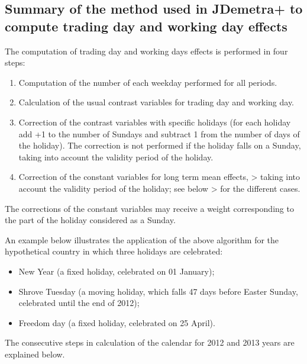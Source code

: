 \documentclass[
  letterpaper,
  DIV=11,
  numbers=noendperiod]{scrreprt}
\begin{document}
\hypertarget{summary-of-the-method-used-in-jdemetra-to-compute-trading-day-and-working-day-effects}{%
\subsection{Summary of the method used in JDemetra+ to compute trading
day and working day
effects}\label{summary-of-the-method-used-in-jdemetra-to-compute-trading-day-and-working-day-effects}}

The computation of trading day and working days effects is performed in
four steps:

\begin{enumerate}
\def\labelenumi{\arabic{enumi}.}
\item
  Computation of the number of each weekday performed for all periods.
\item
  Calculation of the usual contrast variables for trading day and
  working day.
\item
  Correction of the contrast variables with specific holidays (for each
  holiday add +1 to the number of Sundays and subtract 1 from the number
  of days of the holiday). The correction is not performed if the
  holiday falls on a Sunday, taking into account the validity period of
  the holiday.
\item
  Correction of the constant variables for long term mean effects,
  \textgreater{} taking into account the validity period of the holiday;
  see below \textgreater{} for the different cases.
\end{enumerate}

The corrections of the constant variables may receive a weight
corresponding to the part of the holiday considered as a Sunday.

An example below illustrates the application of the above algorithm for
the hypothetical country in which three holidays are celebrated:

\begin{itemize}
\item
  New Year (a fixed holiday, celebrated on 01 January);
\item
  Shrove Tuesday (a moving holiday, which falls 47 days before Easter
  Sunday, celebrated until the end of 2012);
\item
  Freedom day (a fixed holiday, celebrated on 25 April).
\end{itemize}

The consecutive steps in calculation of the calendar for 2012 and 2013
years are explained below.
\end{document}
